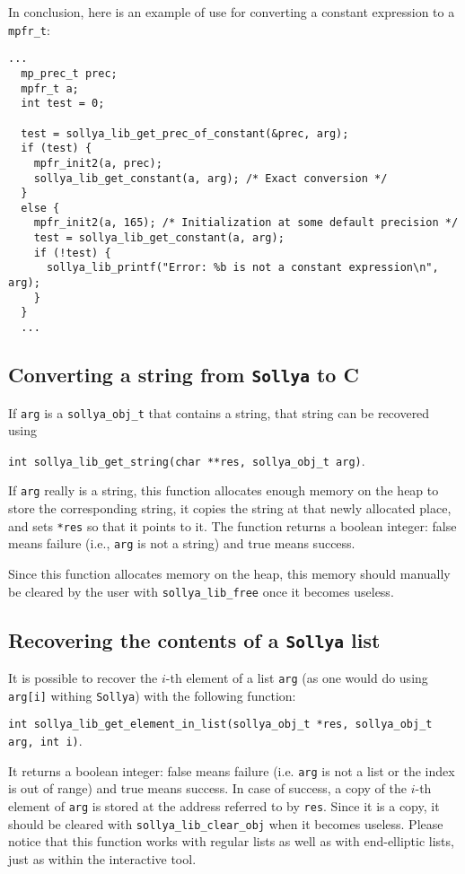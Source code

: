 \documentclass[a4paper]{article}
\newcommand{\sollya}{\texttt{Sollya}\xspace}
\begin{document}
In conclusion, here is an example of use for converting a constant expression to a \verb|mpfr_t|:

\begin{center}\begin{minipage}{15cm}\begin{Verbatim}[frame=single]
  ...
  mp_prec_t prec;
  mpfr_t a;
  int test = 0;

  test = sollya_lib_get_prec_of_constant(&prec, arg);
  if (test) {
    mpfr_init2(a, prec);
    sollya_lib_get_constant(a, arg); /* Exact conversion */
  }
  else {
    mpfr_init2(a, 165); /* Initialization at some default precision */
    test = sollya_lib_get_constant(a, arg);
    if (!test) {
      sollya_lib_printf("Error: %b is not a constant expression\n", arg);
    }
  }
  ...
\end{Verbatim}
\end{minipage}\end{center}

\subsection{Converting a string from \sollya to C}
If \verb|arg| is a \verb|sollya_obj_t| that contains a string, that string can be recovered using
\begin{center}
\verb|int sollya_lib_get_string(char **res, sollya_obj_t arg)|.
\end{center}
If \verb|arg| really is a string, this function allocates enough memory on the heap to store the corresponding string, it copies the string at that newly allocated place, and sets \verb|*res| so that it points to it. The function returns a boolean integer: false means failure (i.e., \verb|arg| is not a string) and true means success.

Since this function allocates memory on the heap, this memory should manually be cleared by the user with \verb|sollya_lib_free| once it becomes useless.

\subsection{Recovering the contents of a \sollya list}
It is possible to recover the $i$-th element of a list \verb|arg| (as one would do using \verb|arg[i]| withing \sollya) with the following function:\\
\begin{center}
  \verb|int sollya_lib_get_element_in_list(sollya_obj_t *res, sollya_obj_t arg, int i)|.
\end{center}
It returns a boolean integer: false means failure (i.e. \verb|arg| is not a list or the index is out of range) and true means success. In case of success, a copy of the $i$-th element of \verb|arg| is stored at the address referred to by \verb|res|. Since it is a copy, it should be cleared with \verb|sollya_lib_clear_obj| when it becomes useless. Please notice that this function works with regular lists as well as with end-elliptic lists, just as within the interactive tool.
\end{document}

